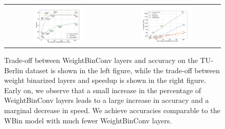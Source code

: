 \begin{figure}
\centering
\begin{tabular}{cc}
\includegraphics[width=0.5\textwidth]{figures/Figure_1.pdf} &
\includegraphics[width=0.5\textwidth]{figures/Figure_2.pdf}\\
\end{tabular}
\caption{Trade-off between WeightBinConv layers and accuracy on the TU-Berlin dataset is shown in the left figure, while the trade-off between weight binarized layers and speedup is shown in the right figure. Early on, we observe that a small increase in the percentage of WeightBinConv layers leads to a large increase in accuracy and a marginal decrease in speed. We achieve accuracies comparable to the WBin model with much fewer WeightBinConv layers.
}
\label{fig:tradeoff}
\end{figure}

